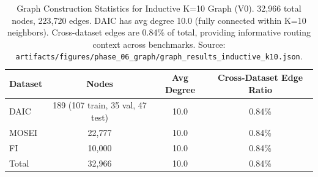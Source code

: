 \begin{table}[htbp]
\centering
\caption{Graph Construction Statistics for Inductive K=10 Graph (V0). 32,966 total nodes, 223,720 edges. DAIC has avg degree 10.0 (fully connected within K=10 neighbors). Cross-dataset edges are 0.84\% of total, providing informative routing context across benchmarks. Source: \texttt{artifacts/figures/phase\_06\_graph/graph\_results\_inductive\_k10.json}.}
\label{tab:graph_stats}
\begin{tabular}{lccc}
\toprule
Dataset & Nodes & Avg Degree & Cross-Dataset Edge Ratio \\
\midrule
DAIC & 189 (107 train, 35 val, 47 test) & 10.0 & 0.84\% \\
MOSEI & 22,777 & 10.0 & 0.84\% \\
FI & 10,000 & 10.0 & 0.84\% \\
\midrule
Total & 32,966 & 10.0 & 0.84\% \\
\bottomrule
\end{tabular}
\end{table}